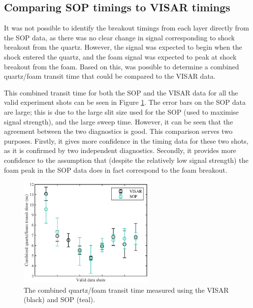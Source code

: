 \subsection{Comparing SOP timings to VISAR timings}
It was not possible to identify the breakout timings from each layer directly from the SOP data, as there was no clear change in signal corresponding to shock breakout from the quartz. However, the signal was expected to begin when the shock entered the quartz, and the foam signal was expected to peak at shock breakout from the foam. Based on this, was possible to determine a combined quartz/foam transit time that could be compared to the VISAR data.

This combined transit time for both the SOP and the VISAR data for all the valid experiment shots can be seen in Figure \ref{fig:SOP Timing}. The error bars on the SOP data are large; this is due to the large slit size used for the SOP (used to maximise signal strength), and the large sweep time. However, it can be seen that the agreement between the two diagnostics is good. This comparison serves two purposes. Firstly, it gives more confidence in the timing data for these two shots, as it is confirmed by two independent diagnostics. Secondly, it provides more confidence to the assumption that (despite the relatively low signal strength) the foam peak in the SOP data does in fact correspond to the foam breakout.

\begin{figure} [h!]
\begin{centering}
\includegraphics[width=0.6\textwidth]{figures/Experiment/SOPVISARtiming.eps}%
\caption{\label{fig:SOP Timing} The combined quartz/foam transit time measured using the VISAR (black) and SOP (teal).}
\end{centering}
\end{figure}





